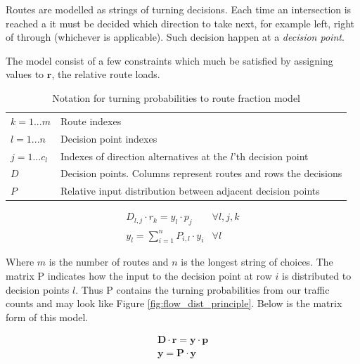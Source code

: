 Routes are modelled as strings of turning decisions. Each time an intersection is reached a it must be decided which direction to take next, for example left, right of through (whichever is applicable). Such decision happen at a \textit{decision point}.

The model consist of a few constraints which much be satisfied by assigning values to $\mathbf{r}$, the relative route loads.

\begin{table}[!ht]
\begin{center}
\begin{tabular}{ll}
\hline
$k = 1...m$ & Route indexes \\
$l = 1...n$ & Decision point indexes  \\
$j = 1...c_l$ & Indexes of direction alternatives at the $l$'th decision point  \\
$D$ & Decision points. Columns represent routes and rows the decisions  \\
$P$ & Relative input distribution between adjacent decision points  \\
\hline
\end{tabular}
\end{center}
\caption{Notation for turning probabilities to route fraction model}
\end{table}

\begin{eqnarray}
D_{l,j} \cdot r_k = y_l \cdot p_j & \forall l,j,k \\
y_l = \sum_{i = 1}^{n}{P_{i,l} \cdot y_i} & \forall l
\end{eqnarray}

Where $m$ is the number of routes and $n$ is the longest string of choices. The matrix P indicates how the input to the decision point at row $i$ is distributed to decision points $l$. Thus P contains the turning probabilities from our traffic counts and may look like Figure \ref{fig:flow_dist_principle}. Below is the matrix form of this model.

\begin{eqnarray}
\mathbf{D} \cdot \mathbf{r} = \mathbf{y} \cdot \mathbf{p} \\
\mathbf{y} = \mathbf{P} \cdot \mathbf{y}
\end{eqnarray}

